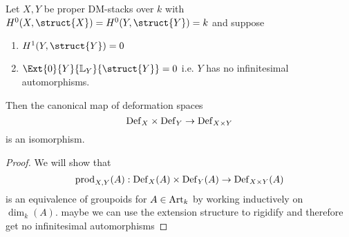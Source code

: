 \documentclass[12pt]{article}
\newcommand{\LL}{\mathbb{L}}
\begin{document}
\begin{prop}
Let $X,Y$ be proper DM-stacks over $k$ with $H^0(X, \struct{X}) = H^0(Y, \struct{Y}) = k$ and suppose
\begin{enumerate}
\item $H^1(Y, \struct{Y}) = 0$
\item $\Ext{0}{Y}{\LL_Y}{\struct{Y}} = 0$ i.e. $Y$ has no infinitesimal automorphisms.
\end{enumerate}
Then the canonical map of deformation spaces
\[ \mathrm{Def}_X \times \mathrm{Def}_Y \to \mathrm{Def}_{X \times Y} \]
is an isomorphism.
\end{prop}

\begin{proof}
We will show that
\[ \mathrm{prod}_{X,Y}(A) : \mathrm{Def}_X(A) \times \mathrm{Def}_Y(A) \to \mathrm{Def}_{X \times Y}(A) \]
is an equivalence of groupoids for $A \in \mathrm{Art}_k$ by working inductively on $\dim_k(A)$. {\color{red} maybe we can use the extension structure to rigidify and therefore get no infinitesimal automorphisms}


\end{proof}
\end{document}
